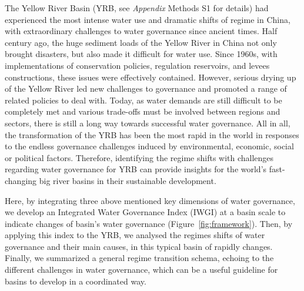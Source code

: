\documentclass[9pt, twocolumn, twoside, lineno]{pnas-new}
\begin{document}
\label{introduction-section-3}
The Yellow River Basin (YRB, see \textit{Appendix} Methods S1 for details) had experienced the most intense water use and dramatic shifts of regime in China, with extraordinary challenges to water governance since ancient times.
Half century ago, the huge sediment loads of the Yellow River in China not only brought disasters, but also made it difficult for water use. 
Since 1960s, with implementations of conservation policies, regulation reservoirs, and levees constructions, these issues were effectively contained.
However, serious drying up of the Yellow River led new challenges to governance and promoted a range of related policies to deal with.
Today, as water demands are still difficult to be completely met and various trade-offs must be involved between regions and sectors, there is still a long way towards successful water governance.
All in all, the transformation of the YRB has been the most rapid in the world in responses to the endless governance challenges induced by environmental, economic, social or political factors.
Therefore, identifying the regime shifts with challenges regarding water governance for YRB can provide insights for the world's fast-changing big river basins in their sustainable development.

\label{introduction-section-3}
Here, by integrating three above mentioned key dimensions of water governance, we develop an Integrated Water Governance Index (IWGI) at a basin scale to indicate changes of basin's water governance (Figure~\ref{fig:framework}).
Then, by applying this index to the YRB, we analysed the regimes shifts of water governance and their main causes, in this typical basin of rapidly changes.
Finally, we summarized a general regime transition schema, echoing to the different challenges in water governance, which can be a useful guideline for basins to develop in a coordinated way.
\end{document}
